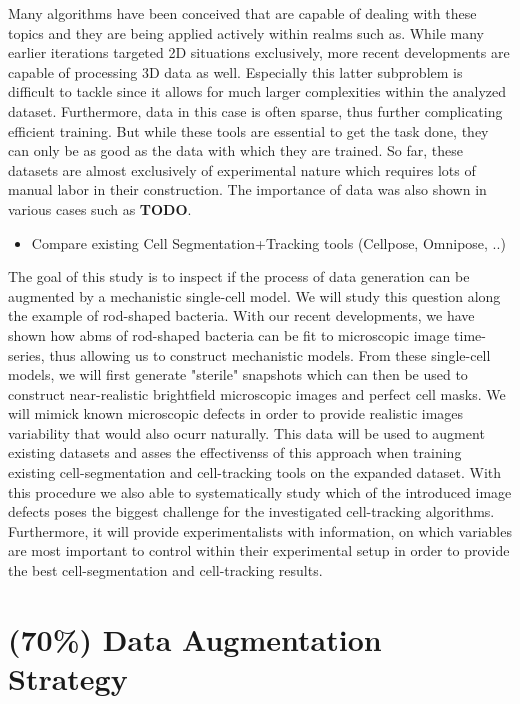 \documentclass{article}
\begin{document}
Many algorithms have been conceived that are capable of dealing with these topics and they are being
applied actively within realms such as.
While many earlier iterations targeted 2D situations exclusively, more recent developments are
capable of processing 3D data as well.
Especially this latter subproblem is difficult to tackle since it allows for much larger
complexities within the analyzed dataset.
Furthermore, data in this case is often sparse, thus further complicating efficient training.
But while these tools are essential to get the task done, they can only be as good as the data with
which they are trained.
So far, these datasets are almost exclusively of experimental nature which requires lots of manual
labor in their construction.
The importance of data was also shown in various cases such as \textbf{TODO}.

\begin{itemize}
    \item Compare existing Cell Segmentation+Tracking tools (Cellpose, Omnipose, ..)
\end{itemize}

The goal of this study is to inspect if the process of data generation can be augmented by a
mechanistic single-cell model.
We will study this question along the example of rod-shaped bacteria.
With our recent developments, we have shown how \acp{abm} of rod-shaped bacteria can be fit to
microscopic image time-series, thus allowing us to construct mechanistic models.
From these single-cell models, we will first generate "sterile" snapshots which can then be used to
construct near-realistic brightfield microscopic images and perfect cell masks.
We will mimick known microscopic defects in order to provide realistic images variability that would
also ocurr naturally.
This data will be used to augment existing datasets and asses the effectivenss of this approach when
training existing cell-segmentation and cell-tracking tools on the expanded dataset.
With this procedure we also able to systematically study which of the introduced image defects poses
the biggest challenge for the investigated cell-tracking algorithms.
Furthermore, it will provide experimentalists with information, on which variables are most
important to control within their experimental setup in order to provide the best cell-segmentation
and cell-tracking results.

\section{(70\%) Data Augmentation Strategy}
\end{document}

